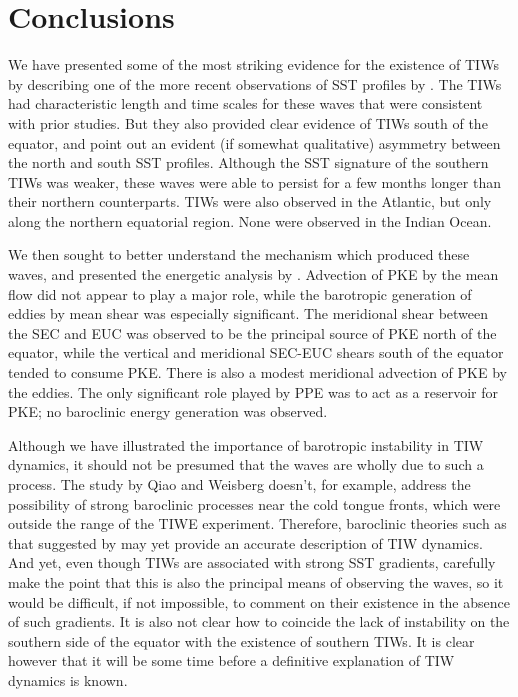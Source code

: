 \documentclass[letterpaper, 11pt, onecolumn]{article}
\begin{document}
\section{Conclusions}

We have presented some of the most striking evidence for the existence of TIWs
by describing one of the more recent observations of SST profiles by
\citet{Chelton++:2000}. The TIWs had characteristic length and time scales for
these waves that were consistent with prior studies. But they also provided
clear evidence of TIWs south of the equator, and point out an evident (if
somewhat qualitative) asymmetry between the north and south SST profiles.
Although the SST signature of the southern TIWs was weaker, these waves were
able to persist for a few months longer than their northern counterparts. TIWs
were also observed in the Atlantic, but only along the northern equatorial
region. None were observed in the Indian Ocean.

We then sought to better understand the mechanism which produced these waves,
and presented the energetic analysis by \citet{Qiao-Weisberg:1998}. Advection
of PKE by the mean flow did not appear to play a major role, while the
barotropic generation of eddies by mean shear was especially significant. The
meridional shear between the SEC and EUC was observed to be the principal
source of PKE north of the equator, while the vertical and meridional SEC-EUC
shears south of the equator tended to consume PKE. There is also a modest
meridional advection of PKE by the eddies. The only significant role played by
PPE was to act as a reservoir for PKE; no baroclinic energy generation was
observed.

Although we have illustrated the importance of barotropic instability in TIW
dynamics, it should not be presumed that the waves are wholly due to such a
process. The study by Qiao and Weisberg doesn't, for example, address the
possibility of strong baroclinic processes near the cold tongue fronts, which
were outside the range of the TIWE experiment. Therefore, baroclinic theories
such as that suggested by \citet{Masina-Philander-Bush:1999} may yet provide an
accurate description of TIW dynamics. And yet, even though TIWs are associated
with strong SST gradients, \citet{Chelton++:2000} carefully make the point that
this is also the principal means of observing the waves, so it would be
difficult, if not impossible, to comment on their existence in the absence of
such gradients. It is also not clear how to coincide the lack of instability on
the southern side of the equator with the existence of southern TIWs. It is
clear however that it will be some time before a definitive explanation of TIW
dynamics is known.

 
\end{document}
